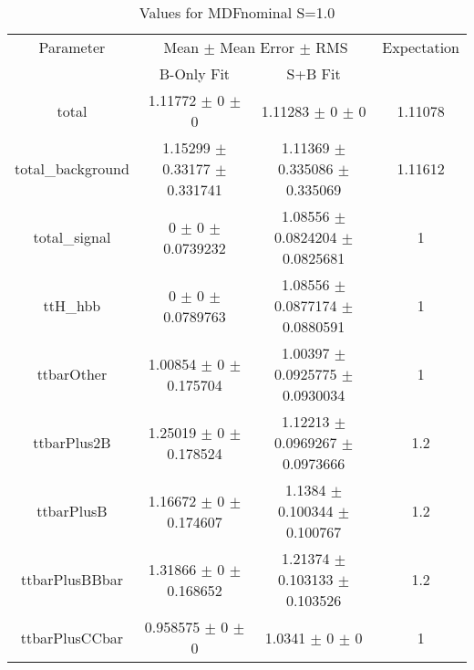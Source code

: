 \begin{table}
\centering
\caption{Values for MDFnominal S=1.0}
\begin{tabular}{cccc}
\toprule
Parameter & \multicolumn{2}{c}{Mean $\pm$ Mean Error $\pm$ RMS} & Expectation\\
 & B-Only Fit & S+B Fit & \\
\midrule
total & \num{1.11772} $\pm$ \num{0} $\pm$ \num{0} & \num{1.11283} $\pm$ \num{0} $\pm$ \num{0} & \num{1.11078}\\
total\_background & \num{1.15299} $\pm$ \num{0.33177} $\pm$ \num{0.331741} & \num{1.11369} $\pm$ \num{0.335086} $\pm$ \num{0.335069} & \num{1.11612}\\
total\_signal & \num{0} $\pm$ \num{0} $\pm$ \num{0.0739232} & \num{1.08556} $\pm$ \num{0.0824204} $\pm$ \num{0.0825681} & \num{1}\\
ttH\_hbb & \num{0} $\pm$ \num{0} $\pm$ \num{0.0789763} & \num{1.08556} $\pm$ \num{0.0877174} $\pm$ \num{0.0880591} & \num{1}\\
ttbarOther & \num{1.00854} $\pm$ \num{0} $\pm$ \num{0.175704} & \num{1.00397} $\pm$ \num{0.0925775} $\pm$ \num{0.0930034} & \num{1}\\
ttbarPlus2B & \num{1.25019} $\pm$ \num{0} $\pm$ \num{0.178524} & \num{1.12213} $\pm$ \num{0.0969267} $\pm$ \num{0.0973666} & \num{1.2}\\
ttbarPlusB & \num{1.16672} $\pm$ \num{0} $\pm$ \num{0.174607} & \num{1.1384} $\pm$ \num{0.100344} $\pm$ \num{0.100767} & \num{1.2}\\
ttbarPlusBBbar & \num{1.31866} $\pm$ \num{0} $\pm$ \num{0.168652} & \num{1.21374} $\pm$ \num{0.103133} $\pm$ \num{0.103526} & \num{1.2}\\
ttbarPlusCCbar & \num{0.958575} $\pm$ \num{0} $\pm$ \num{0} & \num{1.0341} $\pm$ \num{0} $\pm$ \num{0} & \num{1}\\
\bottomrule
\end{tabular}
\end{table}